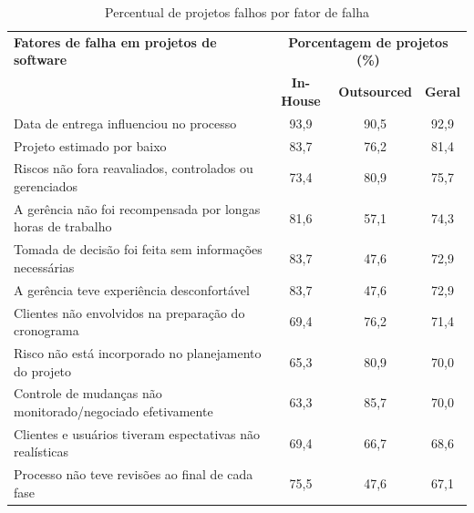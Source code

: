 \begin{table}[ht]
	\centering
	\fontsize{8}{0}
	\caption{Percentual de projetos falhos por fator de falha \cite{CERPA}}
	\label{falhas_em_projetos}
\begin{tabular}{lccc}

\hline

\textbf{Fatores de falha em projetos de software} & \multicolumn{3}{c}{\textbf{Porcentagem de projetos (\%)}}\tabularnewline

\cline{2-4}

& \textbf{In-House} & \textbf{Outsourced} & \textbf{Geral}\tabularnewline

\hline

Data de entrega influenciou no processo & 93,9 & 90,5 & 92,9\tabularnewline

\hline

Projeto estimado por baixo & 83,7 & 76,2 & 81,4\tabularnewline

\hline

Riscos não fora reavaliados, controlados ou gerenciados & 73,4 & 80,9 & 75,7\tabularnewline

\hline

A gerência não foi recompensada por longas horas de trabalho & 81,6 & 57,1 & 74,3\tabularnewline

\hline

Tomada de decisão foi feita sem informações necessárias & 83,7 & 47,6 & 72,9\tabularnewline

\hline

A gerência teve experiência desconfortável & 83,7 & 47,6 & 72,9\tabularnewline

\hline

Clientes não envolvidos na preparação do cronograma & 69,4 & 76,2 & 71,4\tabularnewline

\hline

Risco não está incorporado no planejamento do projeto & 65,3 & 80,9 & 70,0\tabularnewline

\hline

Controle de mudanças não monitorado/negociado efetivamente & 63,3 & 85,7 & 70,0\tabularnewline

\hline

Clientes e usuários tiveram espectativas não realísticas & 69,4 & 66,7 & 68,6\tabularnewline

\hline

Processo não teve revisões ao final de cada fase & 75,5 & 47,6 & 67,1\tabularnewline


\end{tabular}
\end{table}
